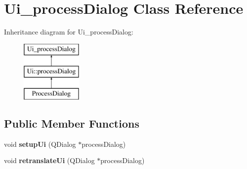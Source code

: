 \hypertarget{class_ui__process_dialog}{
\section{Ui\_\-processDialog Class Reference}
\label{class_ui__process_dialog}
}
Inheritance diagram for Ui\_\-processDialog:\begin{figure}[H]
\begin{center}
\leavevmode
\includegraphics[height=3.000000cm]{class_ui__process_dialog}
\end{center}
\end{figure}
\subsection*{Public Member Functions}
\begin{DoxyCompactItemize}
\item 
\hypertarget{class_ui__process_dialog_add9ffd89cb5e2c1e3d3edd087f886eef}{
void {\bfseries setupUi} (QDialog $\ast$processDialog)}
\label{class_ui__process_dialog_add9ffd89cb5e2c1e3d3edd087f886eef}

\item 
\hypertarget{class_ui__process_dialog_a5cb554af240c0b999d38a211959ba826}{
void {\bfseries retranslateUi} (QDialog $\ast$processDialog)}
\label{class_ui__process_dialog_a5cb554af240c0b999d38a211959ba826}

\end{DoxyCompactItemize}
